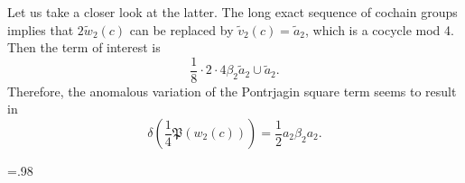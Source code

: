 \documentclass[12pt]{article}
\numberwithin{equation}{section}
\def\fP{\mathfrak{P}}
\begin{document}
Let us take a closer look at the latter.
The long exact sequence of cochain groups implies that $2\widetilde w_2(c)$ can be replaced by
$\widetilde v_2(c) = \widetilde a_2$, which is a cocycle mod 4.
Then the term of interest is
\begin{equation*}
	\dfrac{1}{8}\cdot 2\cdot 4\beta_2\widetilde a_2 \cup \widetilde a_2.
\end{equation*}
Therefore, the anomalous variation of the Pontrjagin square term seems to result in
\begin{equation*}
	\delta\left(
		\dfrac{1}{4}\fP(w_2(c))
	\right)
	=
	\dfrac{1}{2}a_2 \beta_2 a_2.
\end{equation*}


\def\arxivfont{\rm}


\baselineskip=.98\baselineskip
\let\originalthebibliography\thebibliography
\renewcommand\thebibliography[1]{
  \originalthebibliography{#1}
  \setlength{\itemsep}{0pt plus 0.3ex}
}


\end{document}
